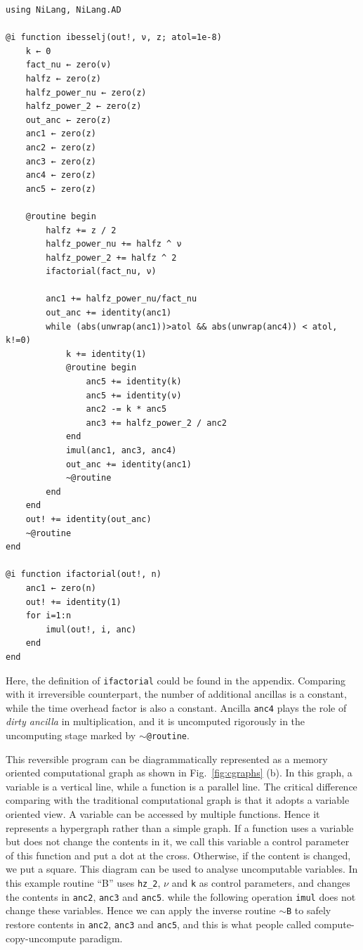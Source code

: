 \documentclass{article}
\newcommand{\<}{\langle}
\renewcommand{\>}{\rangle}
\newcommand{\Fig}[1]{Fig.~\ref{#1}}
\theoremstyle{definition}\newtheorem{definition}{\textit{Definition}}
\begin{document}
\begin{minipage}{\columnwidth}
\begin{lstlisting}[multicols=2]
using NiLang, NiLang.AD

@i function ibesselj(out!, ν, z; atol=1e-8)
    k ← 0
    fact_nu ← zero(ν)
    halfz ← zero(z)
    halfz_power_nu ← zero(z)
    halfz_power_2 ← zero(z)
    out_anc ← zero(z)
    anc1 ← zero(z)
    anc2 ← zero(z)
    anc3 ← zero(z)
    anc4 ← zero(z)
    anc5 ← zero(z)

    @routine begin
        halfz += z / 2
        halfz_power_nu += halfz ^ ν
        halfz_power_2 += halfz ^ 2
        ifactorial(fact_nu, ν)

        anc1 += halfz_power_nu/fact_nu
        out_anc += identity(anc1)
        while (abs(unwrap(anc1))>atol && abs(unwrap(anc4)) < atol, k!=0)
            k += identity(1)
            @routine begin
                anc5 += identity(k)
                anc5 += identity(ν)
                anc2 -= k * anc5
                anc3 += halfz_power_2 / anc2
            end
            imul(anc1, anc3, anc4)
            out_anc += identity(anc1)
            ~@routine
        end
    end
    out! += identity(out_anc)
    ~@routine
end

@i function ifactorial(out!, n)
    anc1 ← zero(n)
    out! += identity(1)
    for i=1:n
        imul(out!, i, anc)
    end
end
\end{lstlisting}
\end{minipage}

Here, the definition of \texttt{ifactorial} could be found in the appendix. Comparing with it irreversible counterpart, the number of additional ancillas is a constant, while the time overhead factor is also a constant.
Ancilla \texttt{anc4} plays the role of \textit{dirty ancilla} in multiplication, and it is uncomputed rigorously in the uncomputing stage marked by \texttt{$\sim$@routine}.

This reversible program can be diagrammatically represented as a memory oriented computational graph as shown in \Fig{fig:cgraphs} (b).
In this graph, a variable is a vertical line, while a function is a parallel line.
The critical difference comparing with the traditional computational graph is that it adopts a variable oriented view.
A variable can be accessed by multiple functions. Hence it represents a hypergraph rather than a simple graph.
If a function uses a variable but does not change the contents in it, we call this variable a control parameter of this function and put a dot at the cross. Otherwise, if the content is changed, we put a square.
This diagram can be used to analyse uncomputable variables. In this example routine ``B'' uses \texttt{hz\_2}, \texttt{$\nu$} and \texttt{k} as control parameters, and changes the contents in \texttt{anc2}, \texttt{anc3} and \texttt{anc5}.
while the following operation \texttt{imul} does not change these variables.
Hence we can apply the inverse routine \texttt{$\sim$B} to safely restore contents in \texttt{anc2}, \texttt{anc3} and \texttt{anc5}, and this is what people called compute-copy-uncompute paradigm.
\end{document}
